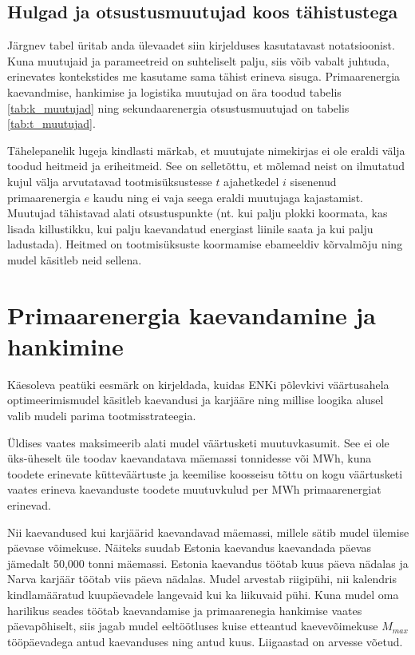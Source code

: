 \documentclass[10pt,a4paper]{article}
\begin{document}
\subsection{Hulgad ja otsustusmuutujad koos tähistustega}
Järgnev tabel üritab anda ülevaadet siin kirjelduses kasutatavast notatsioonist. Kuna muutujaid ja parameetreid on suhteliselt palju, siis võib vabalt juhtuda, erinevates kontekstides me kasutame sama tähist erineva sisuga. Primaarenergia kaevandmise, hankimise ja logistika muutujad on ära toodud tabelis \ref{tab:k_muutujad} ning sekundaarenergia otsustusmuutujad on tabelis \ref{tab:t_muutujad}.





Tähelepanelik lugeja kindlasti märkab, et muutujate nimekirjas ei ole eraldi välja toodud heitmeid ja eriheitmeid. See on selletõttu, et mõlemad neist on ilmutatud kujul välja arvutatavad tootmisüksustesse $t$ ajahetkedel $i$ sisenenud primaarenergia $e$ kaudu ning ei vaja seega eraldi muutujaga kajastamist. Muutujad tähistavad alati otsustuspunkte (nt. kui palju plokki koormata, kas lisada killustikku, kui palju kaevandatud energiast liinile saata ja kui palju ladustada). Heitmed on tootmisüksuste koormamise ebameeldiv kõrvalmõju ning mudel käsitleb neid sellena.

\section{Primaarenergia kaevandamine ja hankimine}

Käesoleva peatüki eesmärk on kirjeldada, kuidas ENKi põlevkivi väärtusah\-ela optimeerimismudel käsitleb kaevandusi ja karjääre ning millise loogika alusel valib mudeli parima tootmisstrateegia.

Üldises vaates maksimeerib alati mudel väärtusketi muutuvkasumit. See ei ole üks-üheselt üle toodav kaevandatava mäemassi tonnidesse või MWh, kuna toodete erinevate kütteväärtuste ja keemilise koosseisu  tõttu on kogu väärtusketi vaates erineva kaevanduste toodete muutuvkulud per MWh primaarenergiat erinevad.

Nii kaevandused kui karjäärid kaevandavad mäemassi, millele sätib mudel ülemise päevase võimekuse. Näiteks suudab Estonia kaevandus kaevandada päe\-vas jämedalt 50,000 tonni mäemassi. Estonia kaevandus töötab kuus päeva nädalas ja Narva karjäär töötab viis päeva nädalas. Mudel arvestab riigipühi, nii kalendris kindlamääratud kuupäevadele langevaid kui ka liikuvaid pühi. Kuna mudel oma harilikus seades töötab kaevandamise ja primaarenegia hankimise vaates päevapõhiselt, siis jagab mudel eeltöötluses kuise etteantud kaevevõimekuse $\mathit{M}_{max}$ tööpäevadega antud kaevanduses ning antud kuus. Liigaastad on arvesse võetud.
\end{document}
